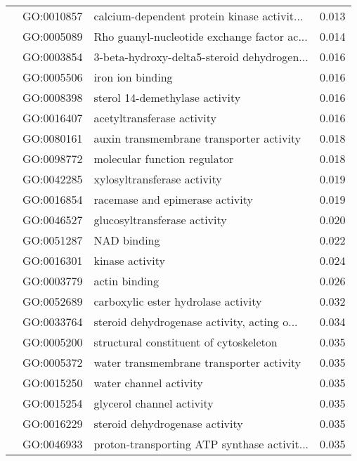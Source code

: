 \begin{longtable}{lllr}
   & GO:0010857 &  calcium-dependent protein kinase activit... &         0.013 \\
   & GO:0005089 &  Rho guanyl-nucleotide exchange factor ac... &         0.014 \\
   & GO:0003854 &  3-beta-hydroxy-delta5-steroid dehydrogen... &         0.016 \\
   & GO:0005506 &                             iron ion binding &         0.016 \\
   & GO:0008398 &               sterol 14-demethylase activity &         0.016 \\
   & GO:0016407 &                   acetyltransferase activity &         0.016 \\
   & GO:0080161 &     auxin transmembrane transporter activity &         0.018 \\
   & GO:0098772 &                 molecular function regulator &         0.018 \\
   & GO:0042285 &                  xylosyltransferase activity &         0.019 \\
   & GO:0016854 &              racemase and epimerase activity &         0.019 \\
   & GO:0046527 &                 glucosyltransferase activity &         0.020 \\
   & GO:0051287 &                                  NAD binding &         0.022 \\
   & GO:0016301 &                              kinase activity &         0.024 \\
   & GO:0003779 &                                actin binding &         0.026 \\
   & GO:0052689 &          carboxylic ester hydrolase activity &         0.032 \\
   & GO:0033764 &  steroid dehydrogenase activity, acting o... &         0.034 \\
   & GO:0005200 &       structural constituent of cytoskeleton &         0.035 \\
   & GO:0005372 &     water transmembrane transporter activity &         0.035 \\
   & GO:0015250 &                       water channel activity &         0.035 \\
   & GO:0015254 &                    glycerol channel activity &         0.035 \\
   & GO:0016229 &               steroid dehydrogenase activity &         0.035 \\
   & GO:0046933 &  proton-transporting ATP synthase activit... &         0.035 \\

\end{longtable}
